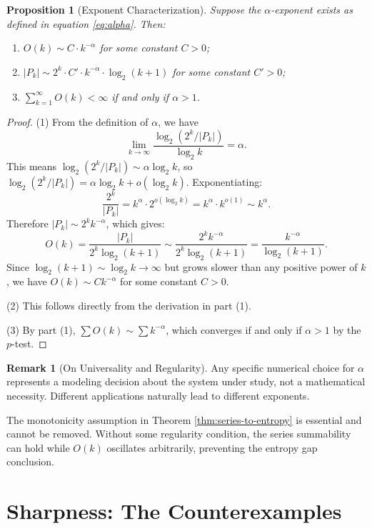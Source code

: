 \documentclass[11pt]{article}
\newtheorem{proposition}[theorem]{Proposition}
\theoremstyle{definition}
\newtheorem{remark}[theorem]{Remark}
\begin{document}
\begin{proposition}[Exponent Characterization]\label{prop:alpha-char}
Suppose the $\alpha$-exponent exists as defined in equation \eqref{eq:alpha}. Then:
\begin{enumerate}
\item $O(k) \sim C \cdot k^{-\alpha}$ for some constant $C > 0$;
\item $|P_k| \sim 2^k \cdot C' \cdot k^{-\alpha} \cdot \log_2(k+1)$ for some constant $C' > 0$;
\item $\sum_{k=1}^\infty O(k) < \infty$ if and only if $\alpha > 1$.
\end{enumerate}
\end{proposition}

\begin{proof}
(1) From the definition of $\alpha$, we have
$$\lim_{k \to \infty} \frac{\log_2(2^k/|P_k|)}{\log_2 k} = \alpha.$$
This means $\log_2(2^k/|P_k|) \sim \alpha \log_2 k$, so $\log_2(2^k/|P_k|) = \alpha \log_2 k + o(\log_2 k)$. Exponentiating:
$$\frac{2^k}{|P_k|} = k^\alpha \cdot 2^{o(\log_2 k)} = k^\alpha \cdot k^{o(1)} \sim k^\alpha.$$
Therefore $|P_k| \sim 2^k k^{-\alpha}$, which gives:
$$O(k) = \frac{|P_k|}{2^k \log_2(k+1)} \sim \frac{2^k k^{-\alpha}}{2^k \log_2(k+1)} = \frac{k^{-\alpha}}{\log_2(k+1)}.$$
Since $\log_2(k+1) \sim \log_2 k \to \infty$ but grows slower than any positive power of $k$, we have $O(k) \sim C k^{-\alpha}$ for some constant $C > 0$.

(2) This follows directly from the derivation in part (1).

(3) By part (1), $\sum O(k) \sim \sum k^{-\alpha}$, which converges if and only if $\alpha > 1$ by the $p$-test.
\end{proof}

\begin{remark}[On Universality and Regularity]\label{rem:universality}
Any specific numerical choice for $\alpha$ represents a modeling decision about the system under study, not a mathematical necessity. Different applications naturally lead to different exponents.

The monotonicity assumption in Theorem \ref{thm:series-to-entropy} is essential and cannot be removed. Without some regularity condition, the series summability can hold while $O(k)$ oscillates arbitrarily, preventing the entropy gap conclusion.
\end{remark}

\section{Sharpness: The Counterexamples}
\end{document}
